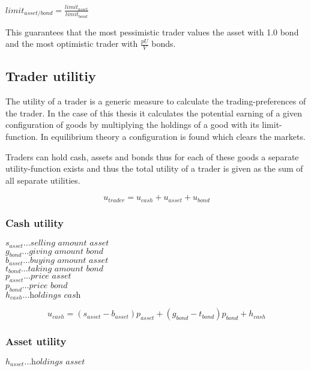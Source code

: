 \documentclass[../Bachelorarbeit.tex]{subfiles}
\begin{document}
\begin{center}
$limit_{asset/bond} = \frac{limit_{asset}}{limit_{bond}}$
\end{center}

This guarantees that the most pessimistic trader values the asset with 1.0 bond and the most optimistic trader with $\frac{pU}{V}$ bonds.

\subsection{Trader utilitiy}
The utility of a trader is a generic measure to calculate the trading-preferences of the trader. In the case of this thesis it calculates the potential earning of a given configuration of goods by multiplying the holdings of a good with its limit-function. In equilibrium theory a configuration is found which clears the markets.

\medskip

Traders can hold cash, assets and bonds thus for each of these goods a separate utility-function exists and thus the total utility of a trader is given as the sum of all separate utilities.

\begin{equation}
u_{trader} = u_{cash} + u_{asset} + u_{bond}
\end{equation}

\subsubsection{Cash utility}
$s_{asset} \dots \textit{selling amount asset}$ \\
$g_{bond} \dots \textit{giving amount bond}$ \\
$b_{asset} \dots \textit{buying amount asset}$ \\
$t_{bond} \dots \textit{taking amount bond}$ \\
$p_{asset} \dots \textit{price asset}$ \\
$p_{bond} \dots \textit{price bond}$ \\
$h_{cash} \dots \textit{holdings cash}$

\begin{equation}
u_{cash} = (s_{asset} - b_{asset} ) p_{asset} + (g_{bond} - t_{bond}) p_{bond} + h_{cash}
\end{equation}

\subsubsection{Asset utility}
$h_{asset} \dots \textit{holdings asset}$ 
\end{document}
